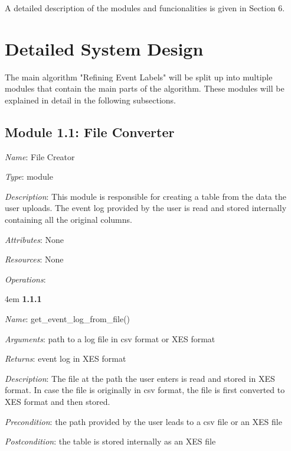 \documentclass[notitlepage]{article}
\begin{document}
\begin{flushleft}
\medskip

A detailed description of the modules and funcionalities is given in Section 6.



















\section{Detailed System Design}
The main algorithm "Refining Event Labels" will be split up into multiple modules that contain the main parts of the algorithm. These modules will be explained in detail in the following subsections.
\subsection{Module 1.1: File Converter}
\textit{Name}: File Creator

\textit{Type}: module

\textit{Description}: This module is responsible for creating a table from the data the user uploads. The event log provided by the user is read and stored internally containing all the original columns. 

\textit{Attributes}: None

\textit{Resources}: None

\textit{Operations}: 
\medskip

\par
\begingroup
\leftskip4em
\textbf{1.1.1}

\textit{Name}: get\_event\_log\_from\_file()

\textit{Arguments}: path to a log file in csv format or XES format

\textit{Returns}: event log in XES format

\textit{Description}: The file at the path the user enters is read and stored in XES format. In case the file is originally in csv format, the file is first converted to XES format and then stored.

\textit{Precondition}: the path provided by the user leads to a csv file or an XES file

\textit{Postcondition}: the table is stored internally as an XES file


\end{flushleft}
\end{document}
